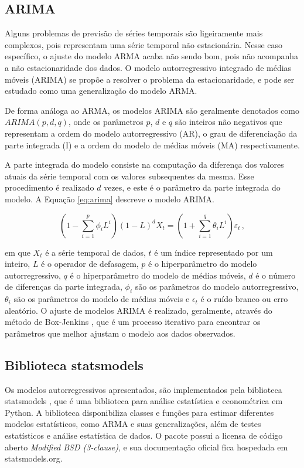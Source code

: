 \subsection{ARIMA}
Alguns problemas de previsão de séries temporais são ligeiramente mais complexos, pois representam uma série temporal não estacionária. Nesse caso específico, o ajuste do modelo ARMA acaba não sendo bom, pois não acompanha a não estacionaridade dos dados. O modelo autorregressivo integrado de médias móveis (ARIMA) se propõe a resolver o problema da estacionaridade, e pode ser estudado como uma generalização do modelo ARMA.

De forma análoga ao ARMA, os modelos ARIMA são geralmente denotados como $ARIMA(p, d, q)$, onde os parâmetros $p$, $d$ e $q$ são inteiros não negativos que representam a ordem do modelo autorregressivo (AR), o grau de diferenciação da parte integrada (I) e a ordem do modelo de médias móveis (MA) respectivamente.

A parte integrada do modelo consiste na computação da diferença dos valores atuais da série temporal com os valores subsequentes da mesma. Esse procedimento é realizado $d$ vezes, e este é o parâmetro da parte integrada do modelo. A Equação \eqref{eq:arima} descreve o modelo ARIMA.

\begin{equation}\label{eq:arima}
    \left(1-\sum_{i=1}^{p} \phi_{i} L^{i}\right)(1-L)^{d} X_{t}=\left(1+\sum_{i=1}^{q} \theta_{i} L^{i}\right) \varepsilon_{t}\, ,
\end{equation}

em que $X_{t}$ é a série temporal de dados, $t$ é um índice representado por um inteiro, $L$ é o operador de defasagem, $p$ é o hiperparâmetro do modelo autorregressivo, $q$ é o hiperparâmetro do modelo de médias móveis, $d$ é o número de diferenças da parte integrada, $\phi_{i}$ são os parâmetros do modelo autorregressivo, $\theta_{i}$ são os parâmetros do modelo de médias móveis e $\epsilon_{t}$ é o ruído branco ou erro aleatório. O ajuste de modelos ARIMA é realizado, geralmente, através do método de Box-Jenkins \cite{box&jenkins}, que é um processo iterativo para encontrar os parâmetros que melhor ajustam o modelo aos dados observados.

\subsection{Biblioteca statsmodels}
Os modelos autorregressivos apresentados, são implementados pela biblioteca statsmodels \cite{seabold2010statsmodels}, que é uma biblioteca para análise estatística e econométrica em Python. A biblioteca disponibiliza classes e funções para estimar diferentes modelos estatísticos, como ARMA e suas generalizações, além de testes estatísticos e análise estatística de dados. O pacote possui a licensa de código aberto \textit{Modified BSD (3-clause)}, e sua documentação oficial fica hospedada em statsmodels.org.

